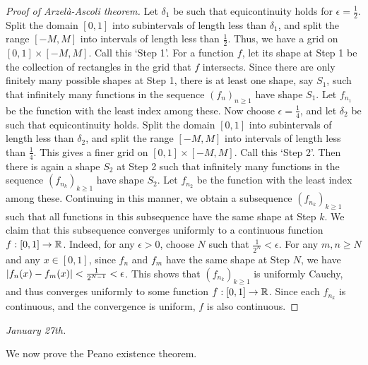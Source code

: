 \begin{proof}[Proof of Arzelà-Ascoli theorem]
    Let $\delta_{1}$ be such that equicontinuity holds for $\epsilon = \frac{1}{2}$. Split the domain $[0,1]$ into subintervals of length less than $\delta_{1}$, and split the range $[-M,M]$ into intervals of length less than $\frac{1}{2}$. Thus, we have a grid on $[0,1] \times [-M,M]$. Call this `Step 1'. For a function $f$, let its shape at Step 1 be the collection of rectangles in the grid that $f$ intersects. Since there are only finitely many possible shapes at Step 1, there is at least one shape, say $S_{1}$, such that infinitely many functions in the sequence $(f_{n})_{n \geq 1}$ have shape $S_{1}$. Let $f_{n_{1}}$ be the function with the least index among these. Now choose $\epsilon = \frac{1}{4}$, and let $\delta_{2}$ be such that equicontinuity holds. Split the domain $[0,1]$ into subintervals of length less than $\delta_{2}$, and split the range $[-M,M]$ into intervals of length less than $\frac{1}{4}$. This gives a finer grid on $[0,1] \times [-M,M]$. Call this `Step 2'. Then there is again a shape $S_{2}$ at Step 2 such that infinitely many functions in the sequence $(f_{n_{k}})_{k \geq 1}$ have shape $S_{2}$. Let $f_{n_{2}}$ be the function with the least index among these. Continuing in this manner, we obtain a subsequence $(f_{n_{k}})_{k \geq 1}$ such that all functions in this subsequence have the same shape at Step $k$. We claim that this subsequence converges uniformly to a continuous function $f:[0,1] \to \mathbb{R}$. Indeed, for any $\epsilon > 0$, choose $N$ such that $\frac{1}{2^{N}} < \epsilon$. For any $m,n \geq N$ and any $x \in [0,1]$, since $f_{n}$ and $f_{m}$ have the same shape at Step $N$, we have $\left| f_{n}(x) - f_{m}(x) \right| < \frac{1}{2^{N-1}} < \epsilon$. This shows that $(f_{n_{k}})_{k \geq 1}$ is uniformly Cauchy, and thus converges uniformly to some function $f:[0,1] \to \mathbb{R}$. Since each $f_{n_{k}}$ is continuous, and the convergence is uniform, $f$ is also continuous.
\end{proof}

\noindent \textit{January 27th.}

We now prove the Peano existence theorem.

